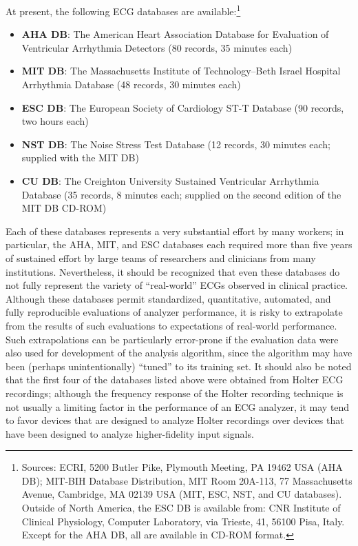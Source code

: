 At present, the following ECG databases are available:\footnote{Sources:
ECRI, 5200 Butler Pike, Plymouth Meeting, PA 19462 USA (AHA DB); MIT-BIH
Database Distribution, MIT Room 20A-113, 77 Massachusetts Avenue, Cambridge,
MA 02139 USA (MIT, ESC, NST, and CU databases).  Outside of North America, the
ESC DB is available from: CNR Institute of Clinical Physiology, Computer
Laboratory, via Trieste, 41, 56100 Pisa, Italy.  Except for the AHA DB,
all are available in CD-ROM format.}
\begin{itemize}
   \item {\bf AHA DB}: The American Heart Association Database for
Evaluation of Ventricular Arrhythmia Detectors (80 records, 35 minutes
each)

   \item {\bf MIT DB}: The Massachusetts Institute of Technology--Beth
Israel Hospital Arrhythmia Database (48 records, 30 minutes each)

   \item {\bf ESC DB}: The European Society of Cardiology ST-T
Database (90 records, two hours each)

   \item {\bf NST DB}: The Noise Stress Test Database (12 records, 30
minutes each; supplied with the MIT DB)

   \item {\bf CU DB}: The Creighton University Sustained Ventricular
Arrhythmia Database (35 records, 8 minutes each; supplied on the
second edition of the MIT DB CD-ROM)

\end{itemize}
Each of these databases represents a very substantial effort by many
workers; in particular, the AHA, MIT, and ESC databases each required
more than five years of sustained effort by large teams of researchers
and clinicians from many institutions.  Nevertheless, it should be
recognized that even these databases do not fully represent the
variety of ``real-world'' ECGs observed in clinical practice.
Although these databases permit standardized, quantitative, automated,
and fully reproducible evaluations of analyzer performance, it is
risky to extrapolate from the results of such evaluations to
expectations of real-world performance.  Such extrapolations can be
particularly error-prone if the evaluation data were also used for
development of the analysis algorithm, since the algorithm may have
been (perhaps unintentionally) ``tuned'' to its training set.  It
should also be noted that the first four of the databases listed above were
obtained from Holter ECG recordings; although the frequency response
of the Holter recording technique is not usually a limiting factor in
the performance of an ECG analyzer, it may tend to favor devices that
are designed to analyze Holter recordings over devices that have been
designed to analyze higher-fidelity input signals.

